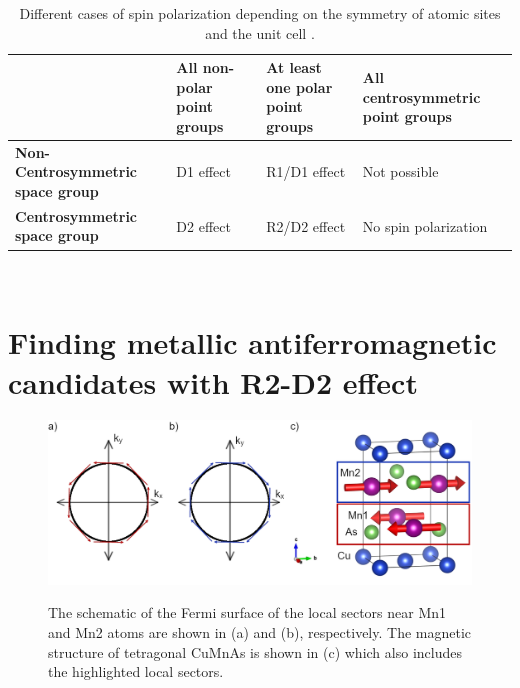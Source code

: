 \documentclass[letterpaper,10pt,doublespacing,edeposit]{uiucthesis2020}
\begin{document}
\begin{mainmatter}
\renewcommand{\arraystretch}{1.2}
\begin{table}
\caption{\label{tab:RD_effect} 
Different cases of spin polarization depending on the symmetry of atomic sites and the unit cell \cite{Zhang2014}.}
\centering
\begin{tabular}{>{\raggedright\arraybackslash}p{5cm}>{\raggedright\arraybackslash}p{3cm}>{\raggedright\arraybackslash}p{3cm}>{\raggedright\arraybackslash}p{3cm}}
\hline\hline
\textbf{} & \textbf{All non-polar point groups} & \textbf{At least one polar point groups} & \textbf{All centrosymmetric point groups}\\
\hline
\textbf{Non-Centrosymmetric space group} & D1 effect & R1/D1 effect & Not possible\\
\hline
\textbf{Centrosymmetric space group} & D2 effect & R2/D2 effect & No spin polarization\\
\hline\hline
\end{tabular}
~\\
\end{table}

\section{Finding metallic antiferromagnetic candidates with R2-D2 effect}

\begin{figure}
\centering\includegraphics[width=\columnwidth]{figures/ch2/wadley_1.png} \\
\caption{\label{fig:wadley_1}
The schematic of the Fermi surface of the local sectors near Mn1 and Mn2 atoms are shown in (a) and (b), respectively. The magnetic structure of tetragonal CuMnAs is shown in (c) which also includes the highlighted local sectors.
}
\end{figure}



\end{mainmatter}
\end{document}

